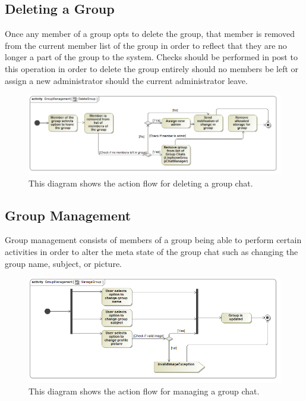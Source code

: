 \documentclass[11pt]{article}
\begin{document}
\subsection{Deleting a Group}
Once any member of a group opts to delete the group, that member is removed from the current member list of the group in order to reflect that they are no longer a part of the group to the system. Checks should be performed in post to this operation in order to delete the group entirely should no members be left or assign a new administrator should the current administrator leave.
\begin{figure}[H]
\centering
\includegraphics[width=5in]{./images/activity_delete_group.png}
\caption[Delete Group Activity Diagram]{This diagram shows the action flow for deleting a group chat.}
\label{ad-delete-group}
\end{figure}
\subsection{Group Management}
Group management consists of members of a group being able to perform certain activities in order to alter the meta state of the group chat such as changing the group name, subject, or picture.
\begin{figure}[H]
\centering
\includegraphics[width=5in]{./images/activity_manage_group.png}
\caption[Manage Group Activity Diagram]{This diagram shows the action flow for managing a group chat.}
\label{ad-manage-group}
\end{figure}
\end{document}
